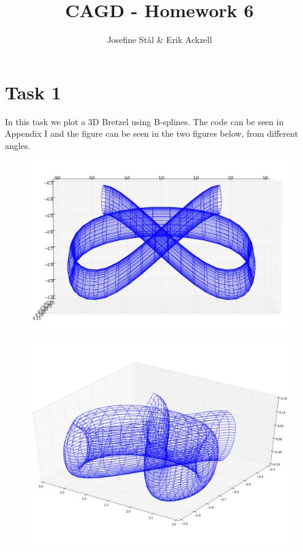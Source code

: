 \documentclass[]{article}
\title{CAGD - Homework 6}
\author{Josefine St{\aa}l \& Erik Ackzell}
\begin{document}
\maketitle
\section*{Task 1}
In this task we plot a 3D Bretzel using B-splines. The code can be seen in Appendix I and the figure can be seen in the two figures below, from different angles.\\

\begin{figure}[h!]
	\includegraphics[scale=0.3]{bretzel3d2}
\end{figure}
\begin{figure}[h!]
	\includegraphics[scale=0.3]{bretzel3d}
\end{figure}
\newpage
\end{document}
